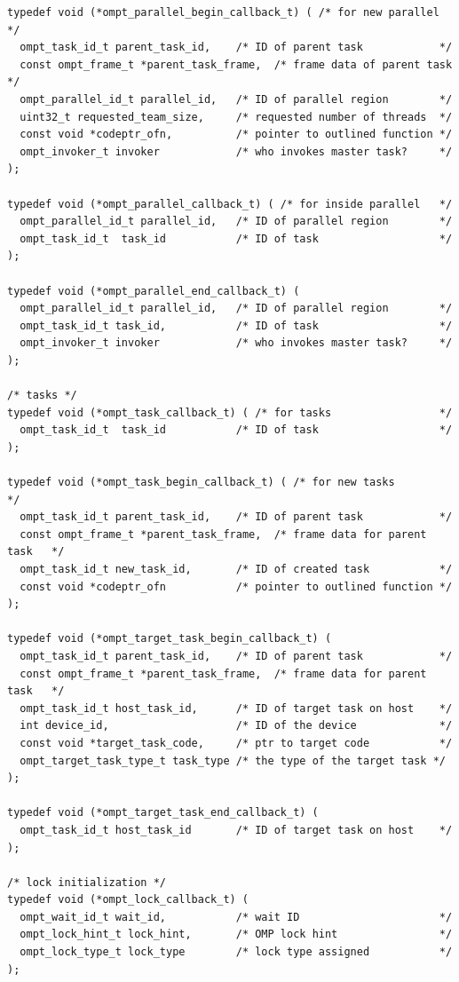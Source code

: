 \documentclass{article}
\begin{document}
{\begin{verbatim}
typedef void (*ompt_parallel_begin_callback_t) ( /* for new parallel  */
  ompt_task_id_t parent_task_id,    /* ID of parent task            */
  const ompt_frame_t *parent_task_frame,  /* frame data of parent task    */
  ompt_parallel_id_t parallel_id,   /* ID of parallel region        */
  uint32_t requested_team_size,     /* requested number of threads  */
  const void *codeptr_ofn,          /* pointer to outlined function */
  ompt_invoker_t invoker            /* who invokes master task?     */
);

typedef void (*ompt_parallel_callback_t) ( /* for inside parallel   */			   
  ompt_parallel_id_t parallel_id,   /* ID of parallel region        */
  ompt_task_id_t  task_id           /* ID of task                   */
);

typedef void (*ompt_parallel_end_callback_t) (
  ompt_parallel_id_t parallel_id,   /* ID of parallel region        */
  ompt_task_id_t task_id,           /* ID of task                   */
  ompt_invoker_t invoker            /* who invokes master task?     */
);
			   		
/* tasks */						    						    
typedef void (*ompt_task_callback_t) ( /* for tasks                 */	   
  ompt_task_id_t  task_id           /* ID of task                   */
);

typedef void (*ompt_task_begin_callback_t) ( /* for new tasks         */
  ompt_task_id_t parent_task_id,    /* ID of parent task            */
  const ompt_frame_t *parent_task_frame,  /* frame data for parent task   */
  ompt_task_id_t new_task_id,       /* ID of created task           */
  const void *codeptr_ofn           /* pointer to outlined function */
);
  
typedef void (*ompt_target_task_begin_callback_t) (
  ompt_task_id_t parent_task_id,    /* ID of parent task            */
  const ompt_frame_t *parent_task_frame,  /* frame data for parent task   */
  ompt_task_id_t host_task_id,      /* ID of target task on host    */
  int device_id,                    /* ID of the device             */
  const void *target_task_code,     /* ptr to target code           */
  ompt_target_task_type_t task_type /* the type of the target task */
);

typedef void (*ompt_target_task_end_callback_t) ( 	   
  ompt_task_id_t host_task_id       /* ID of target task on host    */
);

/* lock initialization */
typedef void (*ompt_lock_callback_t) (
  ompt_wait_id_t wait_id,           /* wait ID                      */
  ompt_lock_hint_t lock_hint,       /* OMP lock hint                */
  ompt_lock_type_t lock_type        /* lock type assigned           */ 
);


\end{verbatim}}
\end{document}
